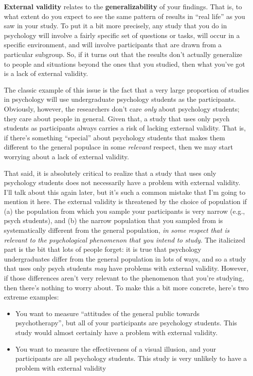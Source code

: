 \documentclass[
]{book}
\begin{document}
\textbf{External validity} relates to the \textbf{generalizability} of your findings. That is, to what extent do you expect to see the same pattern of results in ``real life'' as you saw in your study. To put it a bit more precisely, any study that you do in psychology will involve a fairly specific set of questions or tasks, will occur in a specific environment, and will involve participants that are drawn from a particular subgroup. So, if it turns out that the results don't actually generalize to people and situations beyond the ones that you studied, then what you've got is a lack of external validity.

The classic example of this issue is the fact that a very large proportion of studies in psychology will use undergraduate psychology students as the participants. Obviously, however, the researchers don't care {\emph{only}} about psychology students; they care about people in general. Given that, a study that uses only psych students as participants always carries a risk of lacking external validity. That is, if there's something ``special'' about psychology students that makes them different to the general populace in some {\emph{relevant}} respect, then we may start worrying about a lack of external validity.

That said, it is absolutely critical to realize that a study that uses only psychology students does not necessarily have a problem with external validity. I'll talk about this again later, but it's such a common mistake that I'm going to mention it here. The external validity is threatened by the choice of population if (a) the population from which you sample your participants is very narrow (e.g., psych students), and (b) the narrow population that you sampled from is systematically different from the general population, {\emph{in some respect that is relevant to the psychological phenomenon that you intend to study}}. The italicized part is the bit that lots of people forget: it is true that psychology undergraduates differ from the general population in lots of ways, and so a study that uses only psych students {\emph{may}} have problems with external validity. However, if those differences aren't very relevant to the phenomenon that you're studying, then there's nothing to worry about. To make this a bit more concrete, here's two extreme examples:

\begin{itemize}
\item
  You want to measure ``attitudes of the general public towards psychotherapy'', but all of your participants are psychology students. This study would almost certainly have a problem with external validity.
\item
  You want to measure the effectiveness of a visual illusion, and your participants are all psychology students. This study is very unlikely to have a problem with external validity
\end{itemize}
\end{document}
